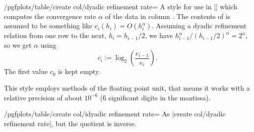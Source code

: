 \begin{stylekey}{/pgfplots/table/create col/dyadic refinement rate=}
    A style for use in |\pgfplotstablecreatecol| which computes the convergence
    rate $\alpha$ of the data in column . The contents of
     is assumed to be something like $e_i(h_i) =
    O(h_i^\alpha)$. Assuming a dyadic refinement relation from one row to the
    next, $h_i = h_{i-1}/2$, we have $h_{i-1}^\alpha / (h_{i-1}/2)^\alpha =
    2^\alpha$, so we get $\alpha$ using
        \[
            c_i := \log_2\left( \frac{e_{i-1}}{e_i} \right).
        \]
    The first value $c_0$ is kept empty.
\begin{codeexample}[pre={\begin{lateximage}},post={\end{lateximage}}]
\end{codeexample}
    This style employs methods of the floating point unit, that means it works
    with a relative precision of about $10^{-6}$ ($6$ significant digits in the
    mantissa).
\end{stylekey}

\begin{stylekey}{/pgfplots/table/create col/idyadic refinement rate=}
    As |create col/dyadic refinement rate|, but the quotient is inverse.
\end{stylekey}

